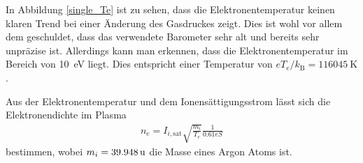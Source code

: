 In Abbildung \vref{single_Te} ist zu sehen, dass die Elektronentemperatur keinen klaren Trend bei einer \"Anderung des Gasdruckes zeigt.
Dies ist wohl vor allem dem geschuldet, dass das verwendete Barometer sehr alt und bereits sehr unpr\"azise ist.
Allerdings kann man erkennen, dass die Elektronentemperatur im Bereich von \SI{10}{\electronvolt} liegt.
Dies entspricht einer Temperatur von $eT_e/k_\text{B}=\SI{116045}{\kelvin}$.

Aus der Elektronentemperatur und dem Ionens\"attigungsstrom l\"asst sich die Elektronendichte im Plasma
\begin{align}
n_e
    =I_{i,\text{sat}}\sqrt{\frac{m_i}{T_e}}\frac{1}{0.61eS}
\end{align}
bestimmen, wobei $m_i=\simAr$ die Masse eines Argon Atoms ist.

